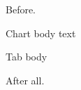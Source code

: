 \documentclass{article}
\begin{document}
Before.
\begin{chart}
\centering Chart body text
\caption{ChartCap}
\end{chart}
\begin{table}
\centering Tab body
\caption{TabCap}
\end{table}
After all.
\end{document}
